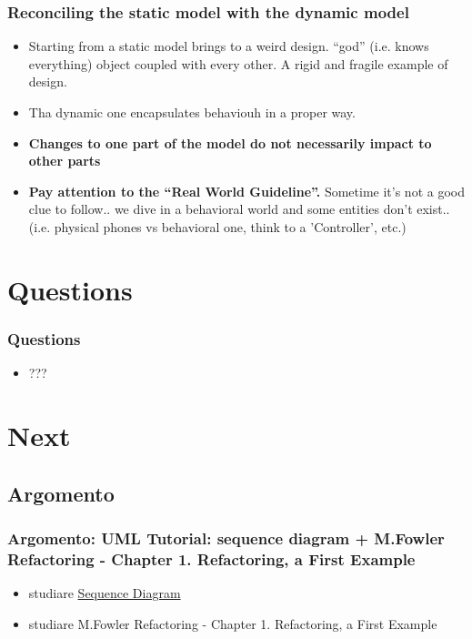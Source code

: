 \documentclass{beamer}
\begin{document}
\begin{frame}
	\frametitle{Reconciling the static model with the dynamic model}
		\begin{itemize}
		\item Starting from a static model brings to a weird design. ``god'' (i.e. knows everything) object coupled with every other. A rigid and fragile example of design.
  		\item Tha dynamic one encapsulates behaviouh in a proper way. 
  		\item \textbf{Changes to one part of the model do not necessarily impact to other parts}
  		\item \textbf{Pay attention to the ``Real World Guideline''.} Sometime it's not a good clue to follow.. we dive in a behavioral world and some entities don't exist.. (i.e. physical phones vs behavioral one, think to a 'Controller', etc.)
  		\end{itemize}
\end{frame}

\section{Questions}
\begin{frame}
	\frametitle{Questions}
	\begin{itemize}
  			\item ??? 
	\end{itemize}
\end{frame}

\section{Next}
\subsection{Argomento}
\begin{frame}
	\frametitle{Argomento: UML Tutorial: sequence diagram + M.Fowler Refactoring - Chapter 1. Refactoring, a First Example}	

	\begin{itemize}
     		\item studiare \href{http://docs.oracle.com/javase/tutorial/java/concepts/class.html}{Sequence Diagram}
     		\item studiare M.Fowler Refactoring - Chapter 1. Refactoring, a First Example
	\end{itemize}
\end{frame}
\end{document}
